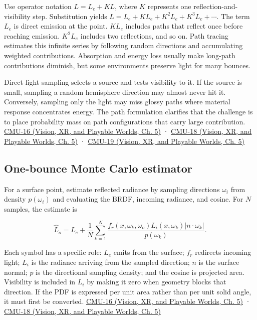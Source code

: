 \hypertarget{03-visual-computing-i-ch011-from-the-rendering-equation-to-paths}{}

Use operator notation \(L=L_e+KL\), where \(K\) represents one reflection-and-visibility step. Substitution yields \(L=L_e+KL_e+K^2L_e+K^3L_e+\cdots\). The term \(L_e\) is direct emission at the point. \(KL_e\) includes paths that reflect once before reaching emission. \(K^2L_e\) includes two reflections, and so on. Path tracing estimates this infinite series by following random directions and accumulating weighted contributions. Absorption and energy loss usually make long-path contributions diminish, but some environments preserve light for many bounces.

Direct-light sampling selects a source and tests visibility to it. If the source is small, sampling a random hemisphere direction may almost never hit it. Conversely, sampling only the light may miss glossy paths where material response concentrates energy. The path formulation clarifies that the challenge is to place probability mass on path configurations that carry large contribution. \href{../07-Vision-XR-and-Playable-Worlds/main.pdf\#nameddest=04-visual-computing-ii-ch036-cmu-16---the-rendering-equation}{CMU-16 (Vision, XR, and Playable Worlds, Ch. 5)} · \href{../07-Vision-XR-and-Playable-Worlds/main.pdf\#nameddest=04-visual-computing-ii-ch036-cmu-18---monte-carlo-rendering}{CMU-18 (Vision, XR, and Playable Worlds, Ch. 5)} · \href{../07-Vision-XR-and-Playable-Worlds/main.pdf\#nameddest=04-visual-computing-ii-ch036-cmu-19---variance-reduction}{CMU-19 (Vision, XR, and Playable Worlds, Ch. 5)}

\subsection{One-bounce Monte Carlo estimator}\label{03-visual-computing-i-ch011-one-bounce-monte-carlo-estimator}

\hypertarget{03-visual-computing-i-ch011-one-bounce-monte-carlo-estimator}{}

For a surface point, estimate reflected radiance by sampling directions \(\omega_i\) from density \(p(\omega_i)\) and evaluating the BRDF, incoming radiance, and cosine. For \(N\) samples, the estimate is

\[
\widehat L_o=L_e+\frac1N\sum_{k=1}^N\frac{f_r(x,\omega_k,\omega_o)L_i(x,\omega_k)|n\cdot\omega_k|}{p(\omega_k)}.
\]

Each symbol has a specific role: \(L_e\) emits from the surface; \(f_r\) redirects incoming light; \(L_i\) is the radiance arriving from the sampled direction; \(n\) is the surface normal; \(p\) is the directional sampling density; and the cosine is projected area. Visibility is included in \(L_i\) by making it zero when geometry blocks that direction. If the PDF is expressed per unit area rather than per unit solid angle, it must first be converted. \href{../07-Vision-XR-and-Playable-Worlds/main.pdf\#nameddest=04-visual-computing-ii-ch036-cmu-16---the-rendering-equation}{CMU-16 (Vision, XR, and Playable Worlds, Ch. 5)} · \href{../07-Vision-XR-and-Playable-Worlds/main.pdf\#nameddest=04-visual-computing-ii-ch036-cmu-18---monte-carlo-rendering}{CMU-18 (Vision, XR, and Playable Worlds, Ch. 5)}

